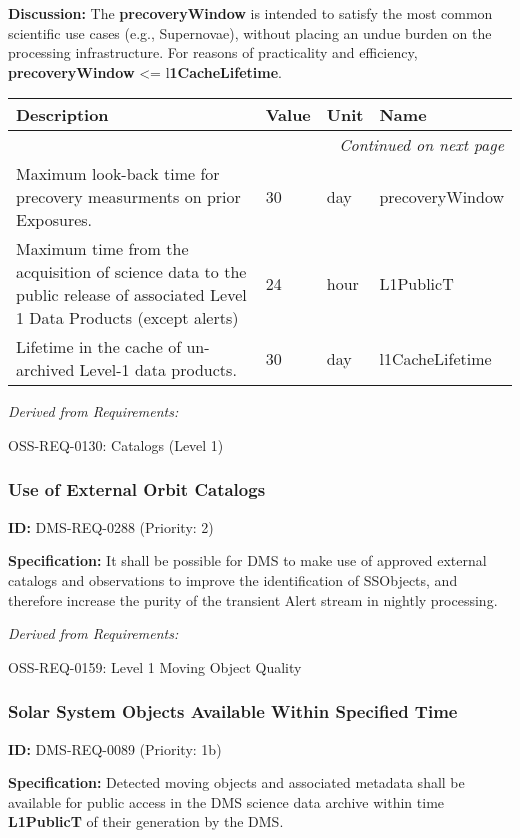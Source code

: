 \documentclass[SE,toc,lsstdraft]{lsstdoc}
\makeatletter
\newcommand{\paramname}[1]{\hspace{0pt}#1}
\newcommand{\unitname}[1]{\hspace{0pt}#1}
\newenvironment{parameters}[0]{%
\setlength\LTleft{0pt}
\setlength\LTright{\fill}
\begin{small}
\begin{longtable}[]{|p{0.49\textwidth}|l|p{0.6in}|p{1.70in}@{}|}

\hline \textbf{Description} & \textbf{Value} & \textbf{Unit} & \textbf{Name} \\ \hline
\endhead

\hline \multicolumn{4}{r}{\emph{Continued on next page}} \\
\endfoot

\hline\hline
\endlastfoot
}{%
\hline
\end{longtable}
\end{small}
}
\makeatother
\begin{document}
\textbf{Discussion: }The \textbf{precoveryWindow }is intended to satisfy the most common scientific use cases (e.g., Supernovae), without placing an undue burden on the processing infrastructure.  For reasons of practicality and efficiency, \textbf{precoveryWindow }<= l\textbf{1CacheLifetime}.

\begin{parameters}
Maximum look-back time for precovery measurments on prior Exposures.
&
30
&
\unitname{%
day
}
&
\paramname{%
precoveryWindow
} \\\hline
Maximum time from the acquisition of science data to the public release of associated Level 1 Data Products (except alerts)
&
24
&
\unitname{%
hour
}
&
\paramname{%
L1PublicT
} \\\hline
Lifetime in the cache of un-archived Level-1 data products.
&
30
&
\unitname{%
day
}
&
\paramname{%
l1CacheLifetime
} \\\hline
\end{parameters}

\emph{Derived from Requirements:}

OSS-REQ-0130:
Catalogs (Level 1) \newline

\subsubsection{Use of External Orbit Catalogs}

\label{DMS-REQ-0288}
\textbf{ID:} DMS-REQ-0288 (Priority: 2)

\textbf{Specification:} It shall be possible for DMS to make use of approved external catalogs and observations to improve the identification of SSObjects, and therefore increase the purity of the transient Alert stream in nightly processing.

\emph{Derived from Requirements:}

OSS-REQ-0159:
Level 1 Moving Object Quality \newline

\subsubsection{Solar System Objects Available Within Specified Time}

\label{DMS-REQ-0089}
\textbf{ID:} DMS-REQ-0089 (Priority: 1b)

\textbf{Specification:} Detected moving objects and associated metadata shall be available for public access in the DMS science data archive within time \textbf{L1PublicT }of their generation by the DMS.
\end{document}
